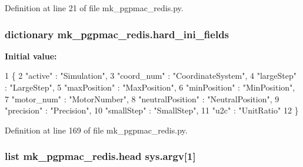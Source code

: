 Definition at line 21 of file mk\-\_\-pgpmac\-\_\-redis.\-py.

\hypertarget{namespacemk__pgpmac__redis_a8257226983aee079ec66f5cc67e194ec}{
\subsubsection[{hard\-\_\-ini\-\_\-fields}]{\setlength{\rightskip}{0pt plus 5cm}dictionary mk\-\_\-pgpmac\-\_\-redis.\-hard\-\_\-ini\-\_\-fields}}\label{namespacemk__pgpmac__redis_a8257226983aee079ec66f5cc67e194ec}
{\bfseries Initial value\-:}
\begin{DoxyCode}
1 \{
2     \textcolor{stringliteral}{"active"}          : \textcolor{stringliteral}{"Simulation"},
3     \textcolor{stringliteral}{"coord\_num"}       : \textcolor{stringliteral}{"CoordinateSystem"},
4     \textcolor{stringliteral}{"largeStep"}       : \textcolor{stringliteral}{"LargeStep"},
5     \textcolor{stringliteral}{"maxPosition"}     : \textcolor{stringliteral}{"MaxPosition"},
6     \textcolor{stringliteral}{"minPosition"}     : \textcolor{stringliteral}{"MinPosition"},
7     \textcolor{stringliteral}{"motor\_num"}       : \textcolor{stringliteral}{"MotorNumber"},
8     \textcolor{stringliteral}{"neutralPosition"} : \textcolor{stringliteral}{"NeutralPosition"},
9     \textcolor{stringliteral}{"precision"}       : \textcolor{stringliteral}{"Precision"},
10     \textcolor{stringliteral}{"smallStep"}       : \textcolor{stringliteral}{"SmallStep"},
11     \textcolor{stringliteral}{"u2c"}             : \textcolor{stringliteral}{"UnitRatio"}
12     \}
\end{DoxyCode}


Definition at line 169 of file mk\-\_\-pgpmac\-\_\-redis.\-py.

\hypertarget{namespacemk__pgpmac__redis_a760ff4955cbf5beef4ae36a28c30b01a}{
\subsubsection[{head}]{\setlength{\rightskip}{0pt plus 5cm}list mk\-\_\-pgpmac\-\_\-redis.\-head sys.\-argv\mbox{[}1\mbox{]}}}\label{namespacemk__pgpmac__redis_a760ff4955cbf5beef4ae36a28c30b01a}


